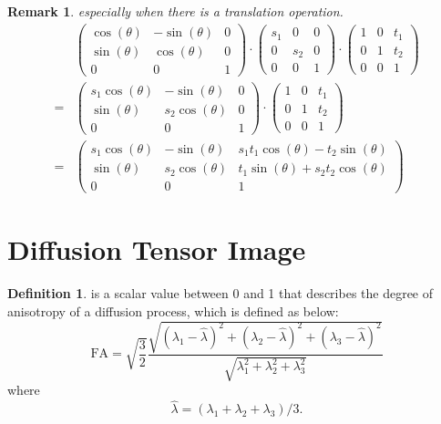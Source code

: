 \documentclass[a4paper]{article}
\theoremstyle{definition}
\newtheorem{definition}{Definition}
\theoremstyle{plain}
\newtheorem{remark}{Remark}
\begin{document}
\begin{remark}
especially when there is a translation operation.
\begin{align*}
    &
    \begin{pmatrix} 
        \cos(\theta) & -\sin(\theta) & 0\\ 
        \sin(\theta) & \cos(\theta) & 0\\ 
        0 & 0 & 1
    \end{pmatrix}\cdot
    \begin{pmatrix} 
        s_{1} & 0 & 0\\ 
        0 & s_{2} & 0\\ 
        0 & 0 & 1
    \end{pmatrix}\cdot
    \begin{pmatrix} 
        1 & 0 & t_1\\ 
        0 & 1 & t_2\\ 
        0 & 0 & 1
    \end{pmatrix}\\
    =&\begin{pmatrix} 
        s_1\cos(\theta) & -\sin(\theta) & 0\\ 
        \sin(\theta) & s_2\cos(\theta) & 0\\ 
        0 & 0 & 1
    \end{pmatrix}\cdot
    \begin{pmatrix} 
        1 & 0 & t_1\\ 
        0 & 1 & t_2\\ 
        0 & 0 & 1
    \end{pmatrix}\\
    =&\begin{pmatrix} 
        s_1\cos(\theta) & -\sin(\theta) & s_1t_1\cos(\theta)-t_2\sin(\theta)\\ 
        \sin(\theta) & s_2\cos(\theta) & t_1\sin(\theta)+s_2t_2\cos(\theta)\\ 
        0 & 0 & 1
    \end{pmatrix}
\end{align*}
\end{remark}

\section{Diffusion Tensor Image}
\begin{definition}
 is a scalar value between 0 and 1 that describes the degree of anisotropy of a diffusion process, which is defined as below:
\begin{equation*}
    {\text{FA}}={\sqrt  {{\frac  {3}{2}}}}{\frac  {{\sqrt  {(\lambda _{1}-{\hat  {\lambda }})^{2}+(\lambda _{2}-{\hat  {\lambda }})^{2}+(\lambda _{3}-{\hat  {\lambda }})^{2}}}}{{\sqrt  {\lambda _{1}^{2}+\lambda _{2}^{2}+\lambda _{3}^{2}}}}}
\end{equation*}
where
\begin{equation*}
     {\hat {\lambda }}=(\lambda _{1}+\lambda _{2}+\lambda _{3})/3.
\end{equation*}
\end{definition}
\end{document}
